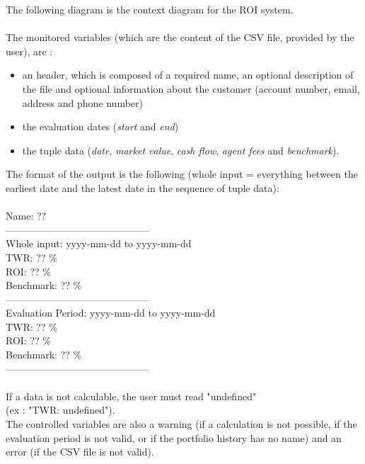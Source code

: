 \documentclass[runningheads,12pt]{article}
\begin{document}
The following diagram is the context diagram for the ROI system.\\
\\
The monitored variables (which are the content of the CSV file, provided by the user), are :
\begin{itemize}
\item an header, which is composed of a required name, an optional description of the file and optional information about the customer (account number, email, address and phone number)
\item the evaluation dates (\textit{start} and \textit{end})
\item the tuple data (\textit{date}, \textit{market value}, \textit{cash flow}, \textit{agent fees} and \textit{benchmark}).
\end{itemize}
\bigskip
The format of the output is the following (whole input = everything between the earliest date and the latest date in the sequence of tuple data):\\
\\
Name: ??\\
--------------------------------------------\\
Whole input: yyyy-mm-dd to yyyy-mm-dd\\
TWR: ?? \%\\ 
ROI: ?? \%\\
Benchmark: ?? \%\\
--------------------------------------------\\
Evaluation Period: yyyy-mm-dd to yyyy-mm-dd\\
TWR: ?? \%\\
ROI: ?? \%\\
Benchmark: ?? \%\\
--------------------------------------------\\
\\
If a data is not calculable, the user must read "undefined" \\
(ex : "TWR: undefined").\\
The controlled variables are also a warning (if a calculation is not possible, if the evaluation period is not valid, or if the portfolio history has no name) and an error (if the CSV file is not valid).\\
\end{document}

